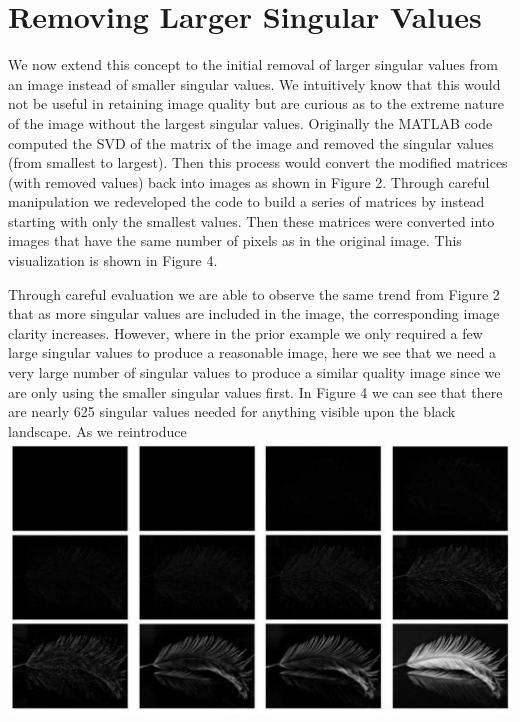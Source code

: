 \documentclass[10pt]{article}
\begin{document}
\section*{Removing Larger Singular Values}
We now extend this concept to the initial removal of larger singular values from an image instead of smaller singular values. We intuitively know that this would not be useful in retaining image quality but are curious as to the extreme nature of the image without the largest singular values. Originally the MATLAB code computed the SVD of the matrix of the image and removed the singular values (from smallest to largest). Then this process would convert the modified matrices (with removed values) back into images as shown in Figure 2. Through careful manipulation we redeveloped the code to build a series of matrices by instead starting with only the smallest values. Then these matrices were converted into images that have the same number of pixels as in the original image. This visualization is shown in Figure 4.

Through careful evaluation we are able to observe the same trend from Figure 2 that as more singular values are included in the image, the corresponding image clarity increases. However, where in the prior example we only required a few large singular values to produce a reasonable image, here we see that we need a very large number of singular values to produce a similar quality image since we are only using the smaller singular values first. In Figure 4 we can see that there are nearly 625 singular values needed for anything visible upon the black landscape. As we reintroduce\\
\includegraphics[max width=\textwidth, center]{2025_04_09_7d70d965b908bc4c1892g-4}
\end{document}
